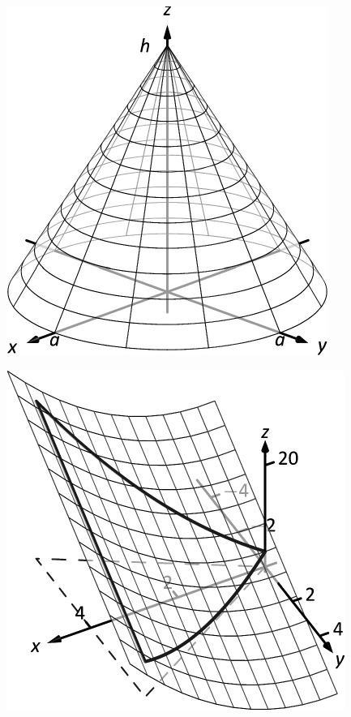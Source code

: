 \documentclass[10pt]{article}
\begin{document}
\includegraphics{figsurfacearea3_3DBW.pdf}
\texttt{}

\includegraphics{figsurfacearea4_3DBW.pdf}
\texttt{}
\end{document}
